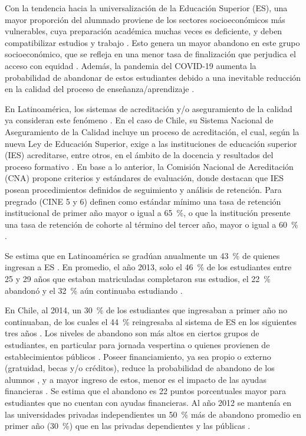 \documentclass[portuguese]{textolivre}
\begin{document}
Con la tendencia hacia la universalización de la Educación Superior (ES), una mayor proporción del alumnado proviene de los sectores socioeconómicos más vulnerables, cuya preparación académica muchas veces es deficiente, y deben compatibilizar estudios y trabajo \cite{HinojosaV2021}. Esto genera un mayor abandono en este grupo socioeconómico, que se refleja en una menor tasa de finalización que perjudica el acceso con equidad \cite{Ferreyra2017,ServiciodeInformaciondeEducacionSuperiorSIES2014}. Además, la pandemia del COVID-19 aumenta la probabilidad de abandonar de estos estudiantes debido a una inevitable reducción en la calidad del proceso de enseñanza/aprendizaje \cite{OECD2021}.

En Latinoamérica, los sistemas de acreditación y/o aseguramiento de la calidad ya consideran este fenómeno \cite{LemaitreIESALC2017}. En el caso de Chile, su Sistema Nacional de Aseguramiento de la Calidad \cite{Ministeriodeeducacion2006} incluye un proceso de acreditación, el cual, según la nueva Ley de Educación Superior, exige a las instituciones de educación superior (IES) acreditarse, entre otros, en el ámbito de la docencia y resultados del proceso formativo \cite{Ministeriodeeducacion2018}. En base a lo anterior, la Comisión Nacional de Acreditación (CNA) propone criterios y estándares de evaluación, donde destacan que IES posean procedimientos definidos de seguimiento y análisis de retención. Para pregrado (CINE 5 y 6) \cite{UNESCOInstituteforStatistics2012} definen como estándar mínimo una tasa de retención institucional de primer año mayor o igual a 65~\%, o que la institución presente una tasa de retención de cohorte al término del tercer año, mayor o igual a 60~\% \cite{ServiciodeInformaciondeEducacionSuperiorSIES2020,ComisionNacionaldeAcreditacionCNA2020}.

Se estima que en Latinoamérica se gradúan anualmente un 43~\% de quienes ingresan a ES \cite{ACACIACultiva}. En promedio, el año 2013, solo el 46~\% de los estudiantes entre 25 y 29 años que estaban matriculadas completaron sus estudios, el 22~\% abandonó y el 32~\% aún continuaba estudiando \cite{Ferreyra2017}.

En Chile, al 2014, un 30~\% de los estudiantes que ingresaban a primer año no continuaban, de los cuales el 44~\% reingresaba al sistema de ES en los siguientes tres años \cite{ServiciodeInformaciondeEducacionSuperiorSIES2014}. Los niveles de abandono son más altos en ciertos grupos de estudiantes, en particular para jornada vespertina o quienes provienen de establecimientos públicos \cite{UNESCO-UIS/OECD/EUROSTAT2005}.  Poseer financiamiento, ya sea propio o externo (gratuidad, becas y/o créditos), reduce la probabilidad de abandono de los alumnos \cite{ServiciodeInformaciondeEducacionSuperiorSIES2020}, y a mayor ingreso de estos, menor es el impacto de las ayudas financieras \cite{BarriosF2011}. Se estima que el abandono es 22 puntos porcentuales mayor para estudiantes que no cuentan con ayudas financieras. Al año 2012 se mantenía en las universidades privadas independientes \cite{UNESCO-UIS/OECD/EUROSTAT2005} un 50~\% más de abandono promedio en primer año (30~\%) que en las privadas dependientes y las públicas \cite{ServiciodeInformaciondeEducacionSuperiorSIES2014}.
\end{document}
